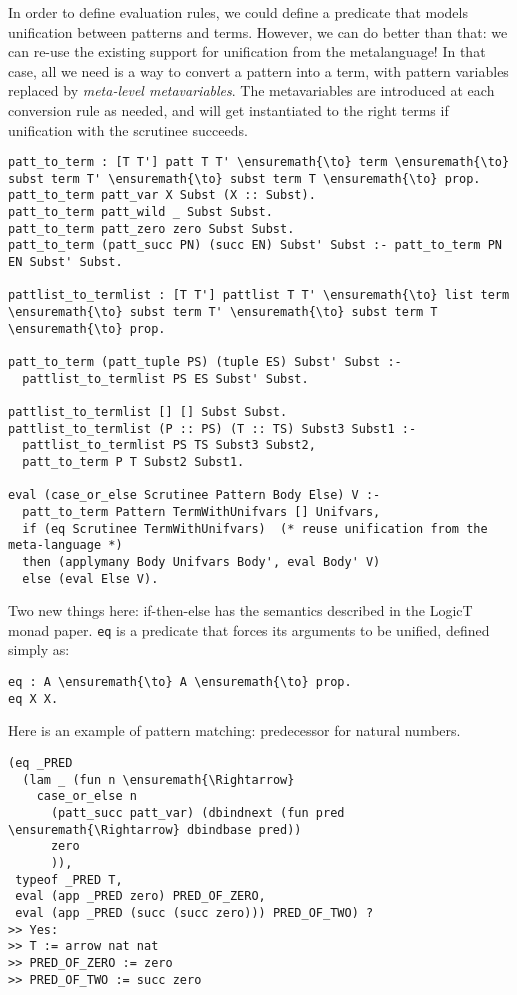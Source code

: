 In order to define evaluation rules, we could define a predicate that
models unification between patterns and terms. However, we can do better
than that: we can re-use the existing support for unification from the
metalanguage! In that case, all we need is a way to convert a pattern
into a term, with pattern variables replaced by \emph{meta-level
metavariables}. The metavariables are introduced at each conversion rule
as needed, and will get instantiated to the right terms if unification
with the scrutinee succeeds.

\begin{verbatim}
patt_to_term : [T T'] patt T T' \ensuremath{\to} term \ensuremath{\to} subst term T' \ensuremath{\to} subst term T \ensuremath{\to} prop.
patt_to_term patt_var X Subst (X :: Subst).
patt_to_term patt_wild _ Subst Subst.
patt_to_term patt_zero zero Subst Subst.
patt_to_term (patt_succ PN) (succ EN) Subst' Subst :- patt_to_term PN EN Subst' Subst.

pattlist_to_termlist : [T T'] pattlist T T' \ensuremath{\to} list term \ensuremath{\to} subst term T' \ensuremath{\to} subst term T \ensuremath{\to} prop.

patt_to_term (patt_tuple PS) (tuple ES) Subst' Subst :-
  pattlist_to_termlist PS ES Subst' Subst.

pattlist_to_termlist [] [] Subst Subst.
pattlist_to_termlist (P :: PS) (T :: TS) Subst3 Subst1 :-
  pattlist_to_termlist PS TS Subst3 Subst2,
  patt_to_term P T Subst2 Subst1.

eval (case_or_else Scrutinee Pattern Body Else) V :-
  patt_to_term Pattern TermWithUnifvars [] Unifvars,
  if (eq Scrutinee TermWithUnifvars)  (* reuse unification from the meta-language *)
  then (applymany Body Unifvars Body', eval Body' V)
  else (eval Else V).
\end{verbatim}

Two new things here: if-then-else has the semantics described in the
LogicT monad paper. \texttt{eq} is a predicate that forces its arguments
to be unified, defined simply as:

\begin{verbatim}
eq : A \ensuremath{\to} A \ensuremath{\to} prop.
eq X X.
\end{verbatim}

Here is an example of pattern matching: predecessor for natural numbers.

\begin{verbatim}
(eq _PRED 
  (lam _ (fun n \ensuremath{\Rightarrow} 
    case_or_else n
      (patt_succ patt_var) (dbindnext (fun pred \ensuremath{\Rightarrow} dbindbase pred))
      zero
      )),
 typeof _PRED T,
 eval (app _PRED zero) PRED_OF_ZERO,
 eval (app _PRED (succ (succ zero))) PRED_OF_TWO) ?
>> Yes:
>> T := arrow nat nat
>> PRED_OF_ZERO := zero
>> PRED_OF_TWO := succ zero
\end{verbatim}
